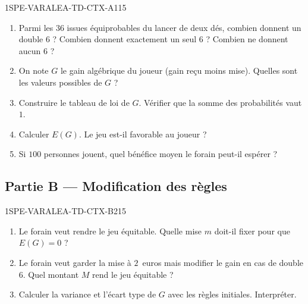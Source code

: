 \begin{exercice}{1SPE-VARALEA-TD-CTX-A}{1}{15}
\begin{enumerate}
  \item Parmi les $36$ issues équiprobables du lancer de deux dés, combien donnent un double $6$ ? Combien donnent exactement un seul $6$ ? Combien ne donnent aucun $6$ ?
  \item On note $G$ le gain algébrique du joueur (gain reçu moins mise). Quelles sont les valeurs possibles de $G$ ?
  \item Construire le tableau de loi de $G$. Vérifier que la somme des probabilités vaut $1$.
  \item Calculer $E(G)$. Le jeu est-il favorable au joueur ?
  \item Si $100$ personnes jouent, quel bénéfice moyen le forain peut-il espérer ?
\end{enumerate}
\end{exercice}

\subsection*{Partie B — Modification des règles}

\begin{exercice}{1SPE-VARALEA-TD-CTX-B}{2}{15}
\begin{enumerate}
  \item Le forain veut rendre le jeu équitable. Quelle mise $m$ doit-il fixer pour que $E(G) = 0$ ?
  \item Le forain veut garder la mise à $2$~euros mais modifier le gain en cas de double $6$. Quel montant $M$ rend le jeu équitable ?
  \item Calculer la variance et l'écart type de $G$ avec les règles initiales. Interpréter.
\end{enumerate}
\end{exercice}
